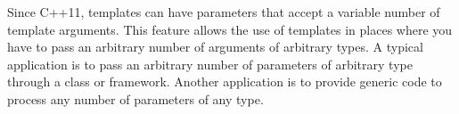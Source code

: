 Since C++11, templates can have parameters that accept a variable number of template arguments. This feature allows the use of templates in places where you have to pass an arbitrary number of arguments of arbitrary types. A typical application is to pass an arbitrary number of parameters of arbitrary type through a class or framework. Another application is to provide generic code to process any number of parameters of any type.